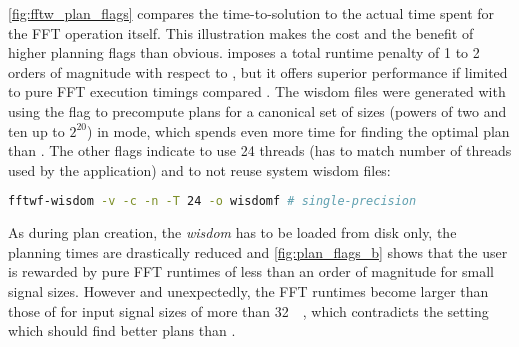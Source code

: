 \cref{fig:fftw_plan_flags} compares the time-to-solution to the actual time spent for the FFT operation itself. This illustration makes the cost and the benefit of higher planning flags than  obvious.  imposes a total runtime penalty of 1 to 2 orders of magnitude with respect to , but it offers superior performance if limited to pure FFT execution timings compared . The wisdom files were generated with  using the flag  to precompute plans for a canonical set of sizes (powers of two and ten up to $2^{20}$) in  mode, which spends even more time for finding the optimal plan than . The other flags indicate to use 24 threads (has to match number of threads used by the application) and to not reuse system wisdom files:
\begin{lstlisting}[language=bash]
 fftwf-wisdom -v -c -n -T 24 -o wisdomf # single-precision
\end{lstlisting}
As during plan creation, the \emph{wisdom} has to be loaded from disk only, the planning times are drastically reduced and \cref{fig:plan_flags_b} shows that the user is rewarded by pure FFT runtimes of less than an order of magnitude for small signal sizes. However and unexpectedly, the FFT runtimes become larger than those of  for input signal sizes of more than \SI{32}{\kibi\byte}, which contradicts the  setting which should find better plans than .

